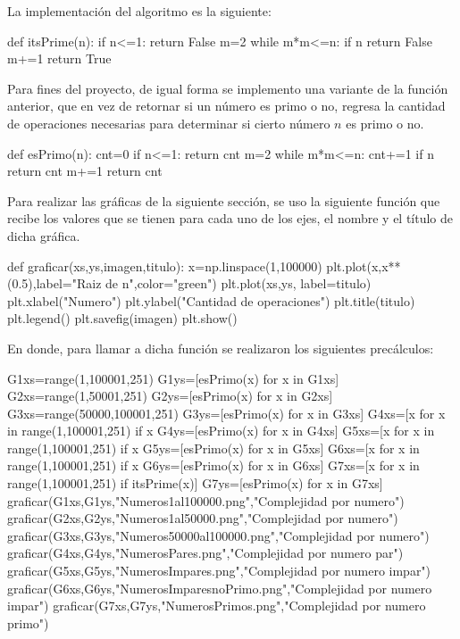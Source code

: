 La implementaci\'on del algoritmo es la siguiente:
\begin{python}
def itsPrime(n):
    if n<=1:
        return False
    m=2
    while m*m<=n:
        if n%
            return False
        m+=1
    return True
\end{python}

Para fines del proyecto, de igual forma se implemento una variante de la funci\'on anterior, que en vez de retornar si un n\'umero es primo o no, regresa la cantidad de operaciones necesarias para determinar si cierto n\'umero $n$ es primo o no. 

\begin{python}
def esPrimo(n):
    cnt=0
    if n<=1:
        return cnt
    m=2
    while m*m<=n:
        cnt+=1
        if n%
            return cnt
        m+=1
    return cnt
\end{python}

Para realizar las gr\'aficas de la siguiente secci\'on, se uso la siguiente funci\'on que recibe los valores que se tienen para cada uno de los ejes, el nombre y el t\'itulo de dicha gr\'afica. 
\begin{python}
def graficar(xs,ys,imagen,titulo):
    x=np.linspace(1,100000)
    plt.plot(x,x**(0.5),label="Raiz de n",color="green")
    plt.plot(xs,ys, label=titulo)
    plt.xlabel("Numero")
    plt.ylabel("Cantidad de operaciones")
    plt.title(titulo) 
    plt.legend()
    plt.savefig(imagen)
    plt.show()
\end{python}
En donde, para llamar a dicha funci\'on se realizaron los siguientes prec\'alculos:
\begin{python}
G1xs=range(1,100001,251)
G1ys=[esPrimo(x) for x in G1xs]
G2xs=range(1,50001,251)
G2ys=[esPrimo(x) for x in G2xs]
G3xs=range(50000,100001,251)
G3ys=[esPrimo(x) for x in G3xs]
G4xs=[x for x in range(1,100001,251) if x%
G4ys=[esPrimo(x) for x in G4xs]
G5xs=[x for x in range(1,100001,251) if x%
G5ys=[esPrimo(x) for x in G5xs]
G6xs=[x for x in range(1,100001,251) if x%
G6ys=[esPrimo(x) for x in G6xs]
G7xs=[x for x in range(1,100001,251) if itsPrime(x)]
G7ys=[esPrimo(x) for x in G7xs]
graficar(G1xs,G1ys,"Numeros1al100000.png","Complejidad por numero")
graficar(G2xs,G2ys,"Numeros1al50000.png","Complejidad por numero")
graficar(G3xs,G3ys,"Numeros50000al100000.png","Complejidad por numero")
graficar(G4xs,G4ys,"NumerosPares.png","Complejidad por numero par")
graficar(G5xs,G5ys,"NumerosImpares.png","Complejidad por numero impar")
graficar(G6xs,G6ys,"NumerosImparesnoPrimo.png","Complejidad por numero impar")
graficar(G7xs,G7ys,"NumerosPrimos.png","Complejidad por numero primo")
\end{python}

